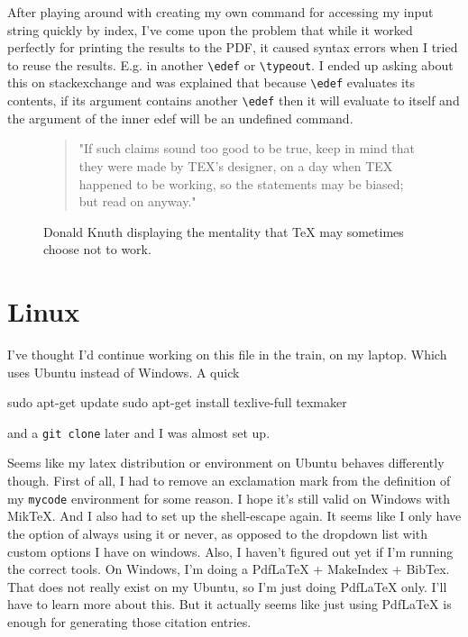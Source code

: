 \documentclass{article} \usepackage[utf8]{inputenc}
\newcommand{\code}[1]{\colorbox{codebggray}{{\texttt{#1}}}}
\begin{document}
After playing around with creating my own command for accessing my input string quickly by index, I've come upon the problem that while it worked perfectly for printing the results to the PDF, it caused syntax errors when I tried to reuse the results. E.g. in another \code{\textbackslash edef} or \code{\textbackslash typeout}. I ended up asking about this on stackexchange and was explained that because \code{\textbackslash edef} evaluates its contents, if its argument contains another \code{\textbackslash edef} then it will evaluate to itself and the argument of the inner edef will be an undefined command.~

\begin{figure}[htbp]
\begin{myquote}
\begin{quote}
"If such claims sound too good to be true, keep in
mind that they were made by TEX’s designer, on a day when TEX happened to
be working, so the statements may be biased; but read on anyway."
\end{quote}
\end{myquote}
\caption{Donald Knuth displaying the mentality that TeX may sometimes choose not to work.~}
\end{figure}

\section{Linux}
I've thought I'd continue working on this file in the train, on my laptop. Which uses Ubuntu instead of Windows. A quick
\begin{mycode}
sudo apt-get update
sudo apt-get install texlive-full texmaker
\end{mycode}
and a \code{git clone} later and I was almost set up.

Seems like my latex distribution or environment on Ubuntu behaves differently though. First of all, I had to remove an exclamation mark from the definition of my \code{mycode} environment for some reason. I hope it's still valid on Windows with MikTeX.
And I also had to set up the shell-escape again. It seems like I only have the option of always using it or never, as opposed to the dropdown list with custom options I have on windows. Also, I haven't figured out yet if I'm running the correct tools. On Windows, I'm doing a PdfLaTeX + MakeIndex + BibTex. That does not really exist on my Ubuntu, so I'm just doing PdfLaTeX only. I'll have to learn more about this.
But it actually seems like just using PdfLaTeX is enough for generating those citation entries.
\end{document}
